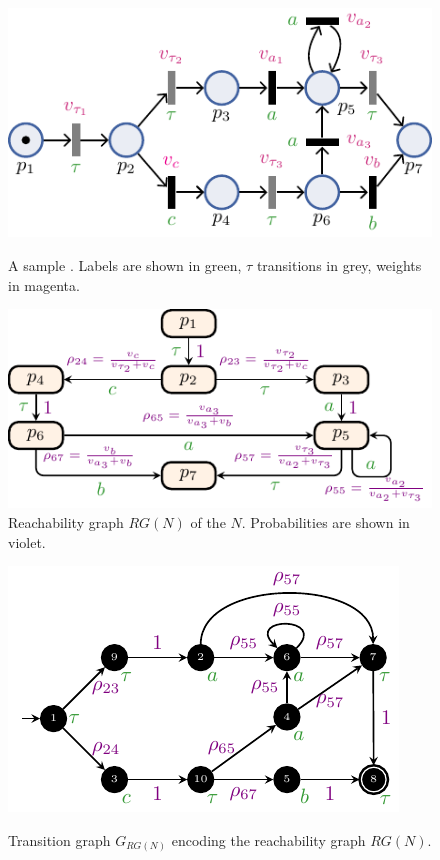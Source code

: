 \begin{figure}[!t]
	\begin{minipage}{.49\textwidth}
		\centering
		\includegraphics[width=.7\textwidth]{images/petri.pdf}
		\caption{A sample \uswn. Labels are shown in green, $\tau$ transitions in grey, weights in magenta.}\label{fig:spn}
	\end{minipage}\hfill \begin{minipage}{.49\textwidth}\centering
		\includegraphics[width=.8\textwidth]{images/rg.pdf}
		\caption{Reachability graph $RG(N)$ of the \uswn $N$. Probabilities are shown in violet.}\label{fig:rg}
	\end{minipage}
\end{figure} \begin{figure}[!t]
	\begin{minipage}{.49\textwidth}\centering \includegraphics[width=.7\textwidth]{images/running_example.pdf}
	\caption{Transition graph $G_{RG(N)}$ encoding the reachability graph $RG(N)$.}\label{fig:lmc}\label{fig:orig}

\end{minipage}
\end{figure}
